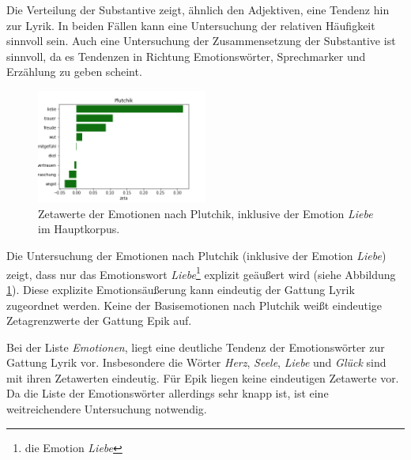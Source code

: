 \documentclass[a4paper,10p]{article}
\begin{document}
Die Verteilung der Substantive zeigt, ähnlich den Adjektiven, eine Tendenz hin zur Lyrik. In beiden Fällen kann eine Untersuchung der relativen Häufigkeit sinnvoll sein. Auch eine Untersuchung der Zusammensetzung der Substantive ist sinnvoll, da es Tendenzen in Richtung Emotionswörter, Sprechmarker und Erzählung zu geben scheint.\par 

\begin{figure}
	\includegraphics[width=0.5\textwidth]{hauptkorpus_prowort_plutchik_kleiner.png}
	\caption{Zetawerte der Emotionen nach Plutchik, inklusive der Emotion \textit{Liebe} im Hauptkorpus.}
	\label{fig:haupt_plutchik}
\end{figure}

Die Untersuchung der Emotionen nach Plutchik (inklusive der Emotion \textit{Liebe}) zeigt, dass nur das Emotionswort \textit{Liebe}\footnote{die Emotion \textit{Liebe}} explizit geäußert wird (siehe Abbildung  \ref{fig:haupt_plutchik}). Diese explizite Emotionsäußerung kann eindeutig der Gattung Lyrik zugeordnet werden. Keine der Basisemotionen nach Plutchik weißt eindeutige Zetagrenzwerte der Gattung Epik auf. \par 

Bei der Liste \textit{Emotionen}, liegt eine deutliche Tendenz der Emotionswörter zur Gattung Lyrik vor. Insbesondere die Wörter \textit{Herz}, \textit{Seele},  \textit{Liebe} und \textit{Glück} sind mit ihren Zetawerten eindeutig. Für Epik liegen keine eindeutigen Zetawerte vor. Da die Liste der Emotionswörter allerdings sehr knapp ist, ist eine weitreichendere Untersuchung notwendig.  \par 
\end{document}
